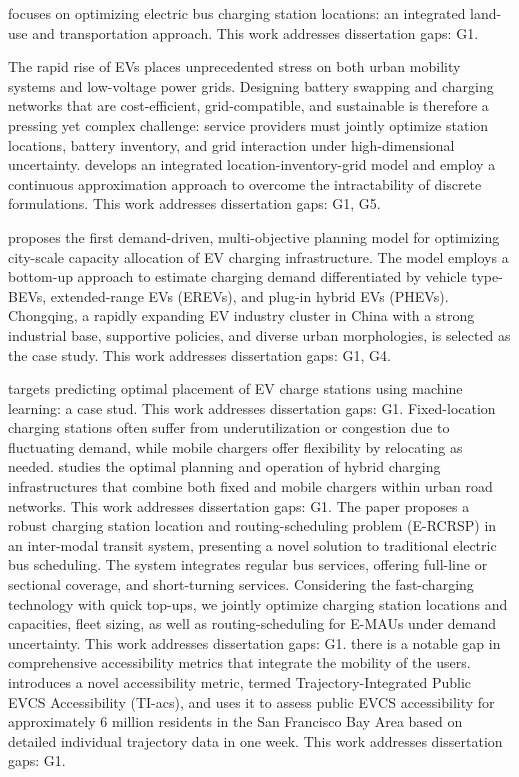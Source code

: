 \documentclass[letterpaper, 12pt, oneside, doublespacing]{Thesis}
\begin{document}
\noindent \cite{optimizing_electric_2025} focuses on optimizing electric bus charging station locations: an integrated land-use and transportation approach. This work addresses dissertation gaps: G1.



\noindent The rapid rise of EVs places unprecedented stress on both urban mobility systems and low-voltage power grids. Designing battery swapping and charging networks that are cost-efficient, grid-compatible, and sustainable is therefore a pressing yet complex challenge: service providers must jointly optimize station locations, battery inventory, and grid interaction under high-dimensional uncertainty. \cite{optimizing_urban_2025} develops an integrated location-inventory-grid model and employ a continuous approximation approach to overcome the intractability of discrete formulations. This work addresses dissertation gaps: G1, G5.



\noindent \cite{planning_future_2025} proposes the first demand-driven, multi-objective planning model for optimizing city-scale capacity allocation of EV charging infrastructure. The model employs a bottom-up approach to estimate charging demand differentiated by vehicle type-BEVs, extended-range EVs (EREVs), and plug-in hybrid EVs (PHEVs). Chongqing, a rapidly expanding EV industry cluster in China with a strong industrial base, supportive policies, and diverse urban morphologies, is selected as the case study. This work addresses dissertation gaps: G1, G4.



\noindent \cite{analyzing_locational_2025} targets predicting optimal placement of EV charge stations using machine learning: a case stud. This work addresses dissertation gaps: G1. Fixed-location charging stations often suffer from underutilization or congestion due to fluctuating demand, while mobile chargers offer flexibility by relocating as needed. \cite{reinforcement_learning_2025} studies the optimal planning and operation of hybrid charging infrastructures that combine both fixed and mobile chargers within urban road networks. This work addresses dissertation gaps: G1. The paper \cite{robust_charging_2025} proposes a robust charging station location and routing-scheduling problem (E-RCRSP) in an inter-modal transit system, presenting a novel solution to traditional electric bus scheduling. The system integrates regular bus services, offering full-line or sectional coverage, and short-turning services. Considering the fast-charging technology with quick top-ups, we jointly optimize charging station locations and capacities, fleet sizing, as well as routing-scheduling for E-MAUs under demand uncertainty. This work addresses dissertation gaps: G1.
there is a notable gap in comprehensive accessibility metrics that integrate the mobility of the users. \cite{trajectory-integrated_accessibility_2025} introduces a novel accessibility metric, termed Trajectory-Integrated Public EVCS Accessibility (TI-acs), and uses it to assess public EVCS accessibility for approximately 6 million residents in the San Francisco Bay Area based on detailed individual trajectory data in one week. This work addresses dissertation gaps: G1.
\end{document}
